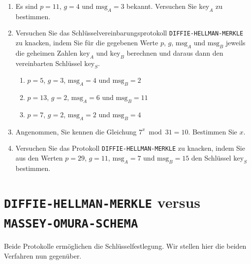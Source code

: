 \begin{enumerate}
	\item Es sind $p = 11$, $g = 4$ und $\text{msg}_A = 3$ bekannt. Versuchen Sie $\text{key}_A$ zu bestimmen.
	\item Versuchen Sie das Schlüsselvereinbarungsprotokoll \texttt{DIFFIE-HELLMAN-MERKLE} zu knacken, indem Sie für die gegebenen Werte $p$, $g$, $\text{msg}_A$ und $\text{msg}_B$ jeweils die geheimen Zahlen $\text{key}_A$ und $\text{key}_B$ berechnen und daraus dann den vereinbarten Schlüssel $\text{key}_S$.
	\begin{enumerate}
		\item $p = 5$, $g = 3$, $\text{msg}_A = 4$ und $\text{msg}_B = 2$
		\item $p = 13$, $g = 2$, $\text{msg}_A = 6$ und $\text{msg}_B = 11$
		\item $p = 7$, $g = 2$, $\text{msg}_A = 2$ und $\text{msg}_B = 4$
	\end{enumerate}
	\item Angenommen, Sie kennen die Gleichung $7^x \bmod 31 = 10$. Bestimmen Sie $x$.
	\item Versuchen Sie das Protokoll \texttt{DIFFIE-HELLMAN-MERKLE} zu knacken, indem Sie aus den Werten $p = 29$, $g = 11$, $\text{msg}_A = 7$ und $\text{msg}_B = 15$ den Schlüssel $\text{key}_S$ bestimmen.
\end{enumerate}

\section{\texttt{DIFFIE-HELLMAN-MERKLE} versus \texttt{MASSEY-OMURA-SCHEMA}}

Beide Protokolle ermöglichen die Schlüsselfestlegung. Wir stellen hier die beiden Verfahren nun gegenüber.


